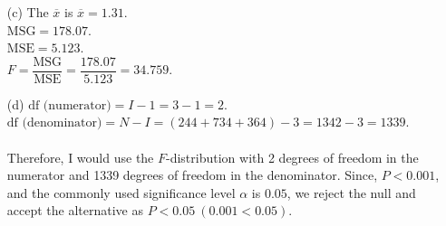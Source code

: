 \documentclass[11pt, a4paper]{article}
\begin{document}
\begin{itemize}
\begin{itemize}
\item[]

\item[(c)]
The $\overline{x}$ is $\overline{x} = 1.31$.\\
$\text{MSG} = 178.07$.\\
$\text{MSE} = 5.123$.\\
$F = \dfrac{\text{MSG}}{\text{MSE}} = \dfrac{178.07}{5.123} = 34.759$.\\

\item[]

\item[(d)]
$\text{df (numerator)} = I - 1 = 3 - 1 = 2$.\\
$\text{df (denominator)} = N - I = (244 + 734 + 364) - 3 = 1342 - 3 = 1339$.\\\\
Therefore, I would use the $F$-distribution with 2 degrees of freedom in the
numerator and 1339 degrees of freedom in the denominator. Since, $P < 0.001$,
and the commonly used significance level $\alpha$ is $0.05$, we reject the null
and accept the alternative as $P < 0.05 \ (0.001 < 0.05)$.
\end{itemize}

\end{itemize}
\end{document}
